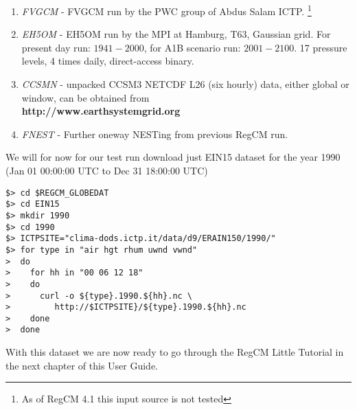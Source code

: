 \begin{enumerate}
Pressure levels, 1.0x1.0L27, 4 times daily.
\item {\em FVGCM} - FVGCM run by the PWC group of Abdus Salam ICTP.
\footnote{As of RegCM 4.1 this input source is not tested}
\item {\em EH5OM} - EH5OM run by the MPI at Hamburg, T63, Gaussian grid.
For present day  run: $1941 - 2000$, for A1B scenario run: $2001 - 2100$. 
17 pressure levels, 4 times daily, direct-access binary.
\item {\em CCSMN} - unpacked CCSM3 NETCDF L26 (six hourly) data, either global
or window, can be obtained from \\ {\bf http://www.earthsystemgrid.org}
\item {\em FNEST} - Further oneway NESTing from previous RegCM run.
\end{enumerate}

We will for now for our test run download just EIN15 dataset for the
year 1990 (Jan 01 00:00:00 UTC to Dec 31 18:00:00 UTC)

\begin{Verbatim}
$> cd $REGCM_GLOBEDAT
$> cd EIN15
$> mkdir 1990
$> cd 1990
$> ICTPSITE="clima-dods.ictp.it/data/d9/ERAIN150/1990/"
$> for type in "air hgt rhum uwnd vwnd"
>  do
>    for hh in "00 06 12 18"
>    do
>      curl -o ${type}.1990.${hh}.nc \
>         http://$ICTPSITE}/${type}.1990.${hh}.nc
>    done
>  done
\end{Verbatim}

With this dataset we are now ready to go through the RegCM Little Tutorial
in the next chapter of this User Guide.
